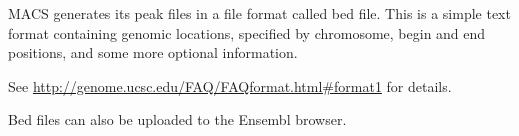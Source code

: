 \begin{note}
MACS generates its peak files in a file format called bed file. This is a simple
text format containing genomic locations, specified by chromosome, begin and end
positions, and some more optional information.

See \url{http://genome.ucsc.edu/FAQ/FAQformat.html#format1} for details.

Bed files can also be uploaded to the Ensembl browser.
\end{note}



%
%
%
%
%
%
%

